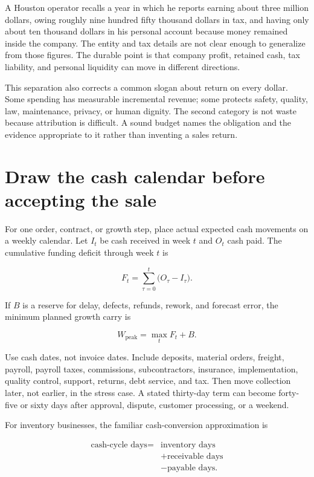 A Houston operator recalls a year in which he reports earning about three
million dollars, owing roughly nine hundred fifty thousand dollars in tax, and
having only about ten thousand dollars in his personal account because money
remained inside the company. The entity and tax details are not clear enough to
generalize from those figures. The durable point is that company profit,
retained cash, tax liability, and personal liquidity can move in different
directions.

This separation also corrects a common slogan about return on every dollar.
Some spending has measurable incremental revenue; some protects safety,
quality, law, maintenance, privacy, or human dignity. The second category is
not waste because attribution is difficult. A sound budget names the obligation
and the evidence appropriate to it rather than inventing a sales return.

\section{Draw the cash calendar before accepting the sale}

For one order, contract, or growth step, place actual expected cash movements on
a weekly calendar. Let \(I_t\) be cash received in week \(t\) and \(O_t\) cash
paid. The cumulative funding deficit through week \(t\) is

\begin{equation}
F_t=\sum_{\tau=0}^{t}\bigl(O_\tau-I_\tau\bigr).
\end{equation}

If \(B\) is a reserve for delay, defects, refunds, rework, and forecast error,
the minimum planned growth carry is

\begin{equation}
W_{\mathrm{peak}}=\max_t F_t+B.
\end{equation}

Use cash dates, not invoice dates. Include deposits, material orders, freight,
payroll, payroll taxes, commissions, subcontractors, insurance, implementation,
quality control, support, returns, debt service, and tax. Then move collection
later, not earlier, in the stress case. A stated thirty-day term can become
forty-five or sixty days after approval, dispute, customer processing, or a
weekend.

For inventory businesses, the familiar cash-conversion approximation is

\begin{equation}
\begin{aligned}
\text{cash-cycle days}={}&\text{inventory days}\\
&+\text{receivable days}\\
&-\text{payable days}.
\end{aligned}
\end{equation}

